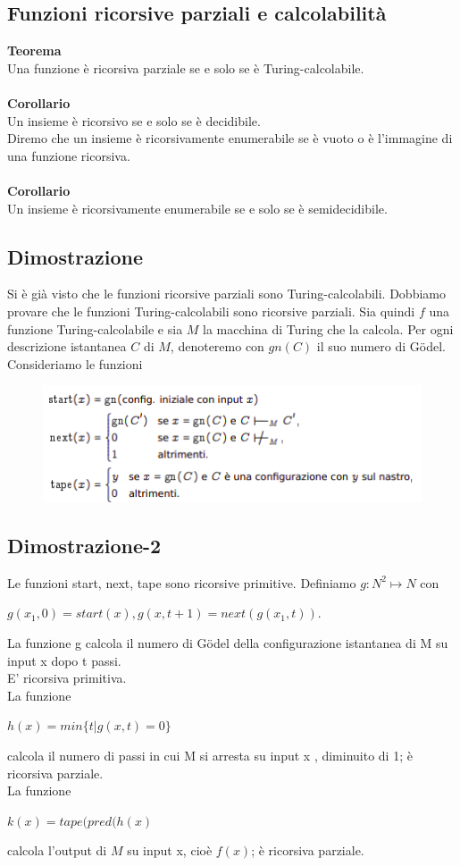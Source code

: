\subsection{Funzioni ricorsive parziali e calcolabilità}
\textbf{Teorema}\\
Una funzione è ricorsiva parziale se e solo se è Turing-calcolabile.\\\\
\textbf{Corollario}\\
Un insieme è ricorsivo se e solo se è decidibile.\\
Diremo che un insieme è ricorsivamente enumerabile se è vuoto o è l’immagine di una funzione ricorsiva.\\\\
\textbf{Corollario}\\
Un insieme è ricorsivamente enumerabile se e solo se è semidecidibile.
\newpage
\subsection{Dimostrazione}
Si è già visto che le funzioni ricorsive parziali sono Turing-calcolabili.
Dobbiamo provare che le funzioni Turing-calcolabili sono ricorsive parziali.
Sia quindi $f$ una funzione Turing-calcolabile e sia $M$ la macchina di Turing che la calcola.
Per ogni descrizione istantanea $C$ di $M$, denoteremo con $gn(C)$ il suo numero di Gödel.\\
Consideriamo le funzioni
\begin{figure}[htp]
    \includegraphics[scale=0.9]{tesi_stile/img/f3cap8.png}
\end{figure}
\newpage
\subsection{Dimostrazione-2}
Le funzioni start, next, tape sono ricorsive primitive. Definiamo $g:N^2 \mapsto N$ con
\begin{center}
    $g(x_1,0) = start(x), g(x ,t+1) = next(g(x_1 ,t)).$
\end{center}
La funzione g calcola il numero di Gödel della configurazione istantanea di M su input x dopo t passi.\\
E' ricorsiva primitiva.\\
La funzione\\
\begin{center}
    $h(x) = min \{t | g(x ,t) = 0\}$
\end{center}
calcola il numero di passi in cui M si arresta su input x , diminuito di 1; è ricorsiva parziale.\\
La funzione\\
\begin{center}
    $k(x) = tape(pred(h(x)$
\end{center}
calcola l’output di $M$ su input x, cioè $f(x)$; è ricorsiva parziale.
